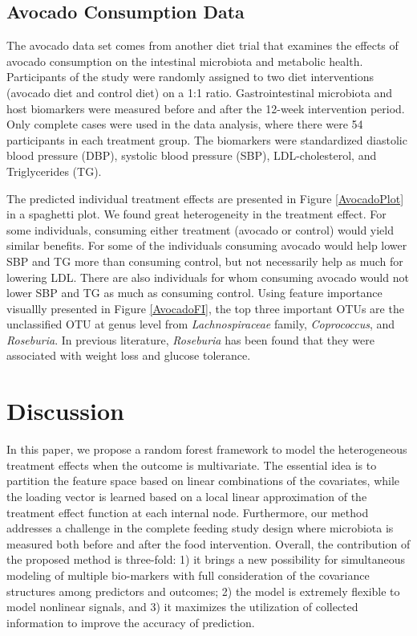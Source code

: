 \documentclass[smallextended]{svjour3}
\begin{document}
\subsection{Avocado Consumption Data}
The avocado data set comes from another diet trial \citep{Avocado} that examines the effects of avocado consumption on the intestinal microbiota and metabolic health. Participants of the study were randomly assigned to two diet interventions (avocado diet and control diet) on a 1:1 ratio. Gastrointestinal microbiota and host biomarkers were measured before and after the 12-week intervention period. Only complete cases were used in the data analysis, where there were 54 participants in each treatment group. The biomarkers were standardized diastolic blood pressure (DBP), systolic blood pressure (SBP), LDL-cholesterol, and Triglycerides (TG).

The predicted individual treatment effects are presented in Figure \ref{AvocadoPlot} in a spaghetti plot. We found great heterogeneity in the treatment effect. For some individuals, consuming either treatment (avocado or control) would yield similar benefits. For some of the individuals consuming avocado would help lower SBP and TG more than consuming control, but not necessarily help as much for lowering LDL. There are also individuals for whom consuming avocado would not lower SBP and TG as much as consuming control. Using feature importance visuallly presented in Figure \ref{AvocadoFI}, the top three important OTUs are the unclassified OTU at genus level from \textit{Lachnospiraceae} family, \textit{Coprococcus}, and \textit{Roseburia}. In previous literature, \textit{Roseburia} has been found that they were associated with weight loss and glucose tolerance. \citep{ryan2014fxr}


\section{Discussion}\label{Disc}

In this paper, we propose a random forest framework to model the heterogeneous treatment effects when the outcome is multivariate. The essential idea is to partition the feature space based on linear combinations of the covariates, while the loading vector is learned based on a local linear approximation of the treatment effect function at each internal node. Furthermore, our method addresses a challenge in the complete feeding study design where microbiota is measured both before and after the food intervention. Overall, the contribution of the proposed method is three-fold: 1) it brings a new possibility for simultaneous modeling of multiple bio-markers with full consideration of the covariance structures among predictors and outcomes; 2) the model is extremely flexible to model nonlinear signals, and 3) it maximizes the utilization of collected information to improve the accuracy of prediction. 
\end{document}
